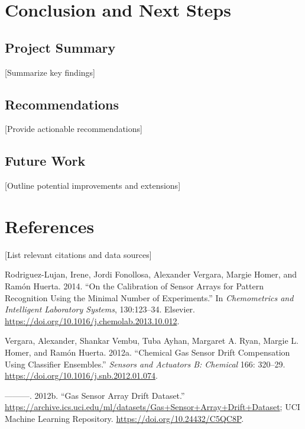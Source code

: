 \documentclass[
  letterpaper,
  DIV=11,
  numbers=noendperiod]{scrartcl}
\newlength{\cslhangindent}
\newenvironment{CSLReferences}[2] %
 {\begin{list}{}{%
  \setlength{\itemindent}{0pt}
  \setlength{\leftmargin}{0pt}
  \setlength{\parsep}{0pt}
  \ifodd #1
   \setlength{\leftmargin}{\cslhangindent}
   \setlength{\itemindent}{-1\cslhangindent}
  \fi
  \setlength{\itemsep}{#2\baselineskip}}}
 {\end{list}}
\begin{document}
\section{Conclusion and Next Steps}\label{conclusion-and-next-steps}

\subsection{Project Summary}\label{project-summary}

{[}Summarize key findings{]}

\subsection{Recommendations}\label{recommendations}

{[}Provide actionable recommendations{]}

\subsection{Future Work}\label{future-work}

{[}Outline potential improvements and extensions{]}

\section{References}\label{references}

{[}List relevant citations and data sources{]}

\label{refs}
\begin{CSLReferences}{1}{0}
Rodriguez-Lujan, Irene, Jordi Fonollosa, Alexander Vergara, Margie
Homer, and Ramón Huerta. 2014. {``On the Calibration of Sensor Arrays
for Pattern Recognition Using the Minimal Number of Experiments.''} In
\emph{Chemometrics and Intelligent Laboratory Systems}, 130:123--34.
Elsevier. \url{https://doi.org/10.1016/j.chemolab.2013.10.012}.

Vergara, Alexander, Shankar Vembu, Tuba Ayhan, Margaret A. Ryan, Margie
L. Homer, and Ramón Huerta. 2012a. {``Chemical Gas Sensor Drift
Compensation Using Classifier Ensembles.''} \emph{Sensors and Actuators
B: Chemical} 166: 320--29.
\url{https://doi.org/10.1016/j.snb.2012.01.074}.

---------. 2012b. {``Gas Sensor Array Drift Dataset.''}
\url{https://archive.ics.uci.edu/ml/datasets/Gas+Sensor+Array+Drift+Dataset};
UCI Machine Learning Repository. \url{https://doi.org/10.24432/C5QC8P}.

\end{CSLReferences}
\end{document}
